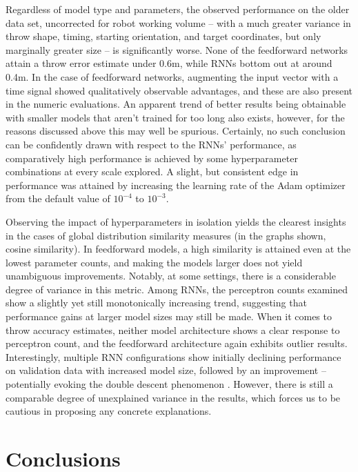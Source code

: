 \documentclass{article}
\begin{document}
Regardless of model type and parameters, the observed performance on the older data set, uncorrected for robot working volume -- with a much greater variance in throw shape, timing, starting orientation, and target coordinates, but only marginally greater size -- is significantly worse. None of the feedforward networks attain a throw error estimate under 0.6m, while RNNs bottom out at around 0.4m. In the case of feedforward networks, augmenting the input vector with a time signal showed qualitatively observable advantages, and these are also present in the numeric evaluations. An apparent trend of better results being obtainable with smaller models that aren't trained for too long also exists, however, for the reasons discussed above this may well be spurious. Certainly, no such conclusion can be confidently drawn with respect to the RNNs' performance, as comparatively high performance is achieved by some hyperparameter combinations at every scale explored. A slight, but consistent edge in performance was attained by increasing the learning rate of the Adam optimizer from the default value of $10^{-4}$ to $10^{-3}$.

Observing the impact of hyperparameters in isolation yields the clearest insights in the cases of global distribution similarity measures (in the graphs shown, cosine similarity). In feedforward models, a high similarity is attained even at the lowest parameter counts, and making the models larger does not yield unambiguous improvements. Notably, at some settings,  there is a considerable degree of variance in this metric. Among RNNs, the perceptron counts examined show a slightly yet still monotonically increasing trend, suggesting that performance gains at larger model sizes may still be made. When it comes to throw accuracy estimates, neither model architecture shows a clear response to perceptron count, and the feedforward architecture again exhibits outlier results. Interestingly, multiple RNN configurations show initially declining performance on validation data with increased model size, followed by an improvement -- potentially evoking the double descent phenomenon \citep{nakkiran2021deep}. However, there is still a comparable degree of unexplained variance in the results, which forces us to be cautious in proposing any concrete explanations.

\section{Conclusions}
\end{document}
